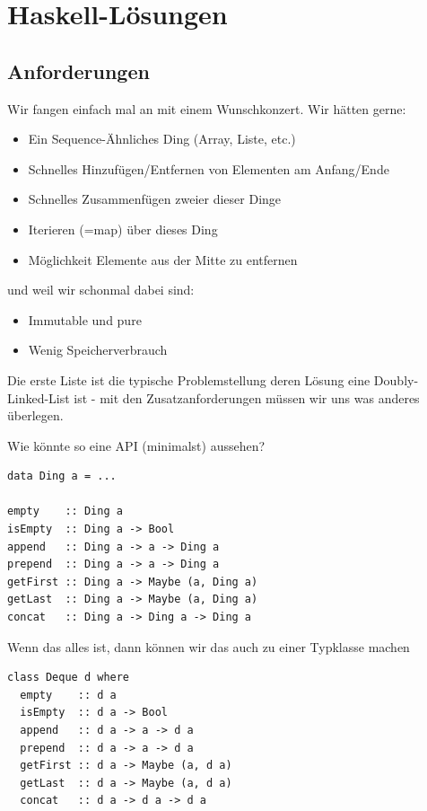 \documentclass{beamer}
\begin{document}
\section{Haskell-Lösungen}
 
\subsection{Anforderungen}
\begin{frame}
Wir fangen einfach mal an mit einem Wunschkonzert. Wir hätten gerne:
\pause
\begin{itemize}
 \item Ein Sequence-Ähnliches Ding (Array, Liste, etc.)
 \pause
 \item Schnelles Hinzufügen/Entfernen von Elementen am Anfang/Ende
 \pause
 \item Schnelles Zusammenfügen zweier dieser Dinge
 \pause
 \item Iterieren (=map) über dieses Ding
 \pause
 \item Möglichkeit Elemente aus der Mitte zu entfernen
 \pause
\end{itemize}
und weil wir schonmal dabei sind:
\begin{itemize}
 \item Immutable und pure
 \pause
 \item Wenig Speicherverbrauch
 \pause
\end{itemize}
Die erste Liste ist die typische Problemstellung deren Lösung eine Doubly-Linked-List ist - mit den Zusatzanforderungen müssen wir uns was anderes überlegen.
\end{frame}

\begin{frame}[fragile]
Wie könnte so eine API (minimalst) aussehen?
\pause
\begin{verbatim}
data Ding a = ...

empty    :: Ding a
isEmpty  :: Ding a -> Bool
append   :: Ding a -> a -> Ding a
prepend  :: Ding a -> a -> Ding a
getFirst :: Ding a -> Maybe (a, Ding a)
getLast  :: Ding a -> Maybe (a, Ding a)
concat   :: Ding a -> Ding a -> Ding a
\end{verbatim}
\end{frame}

\begin{frame}[fragile]
Wenn das alles ist, dann können wir das auch zu einer Typklasse machen
\pause
\begin{verbatim}
class Deque d where
  empty    :: d a
  isEmpty  :: d a -> Bool
  append   :: d a -> a -> d a
  prepend  :: d a -> a -> d a
  getFirst :: d a -> Maybe (a, d a)
  getLast  :: d a -> Maybe (a, d a)
  concat   :: d a -> d a -> d a
\end{verbatim}
\end{frame}
\end{document}
